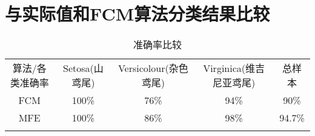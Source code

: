\section{与实际值和FCM算法分类结果比较}
\begin{table}[!ht]
    \label{准确率比较}
    \caption{准确率比较}
    \centering
    \begin{tabular}{c | c c c c}
        \whline 算法/各类准确率 & Setosa(山鸢尾) & Versicolour(杂色鸢尾) & Virginica(维吉尼亚鸢尾) & 总样本 \\\whline
        FCM                     & 100\%          & 76\%                  & 94\%                    & 90\%   \\
        MFE                     & 100\%          & 86\%                  & 98\%                    & 94.7\% \\
        \whline
    \end{tabular}
\end{table}